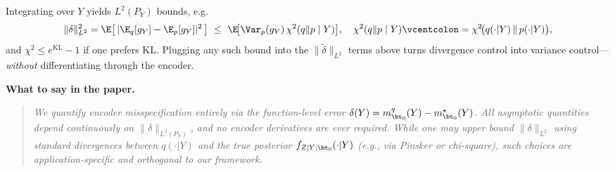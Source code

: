 Integrating over \(Y\) yields \(L^2(P_Y)\) bounds, e.g.
\[
\|\delta\|_{L^2}^2
=\E\big[\,|\E_q[g_Y]-\E_p[g_Y]|^2\,\big]
\ \le\ \E\!\big[\Var_p(g_Y)\,\chi^2(q\|p\mid Y)\big],
\quad
\chi^2(q\|p\mid Y)\vcentcolon=\chi^2\!\big(q(\cdot|Y)\,\|\,p(\cdot|Y)\big),
\]
and \(\chi^2 \le e^{\mathrm{KL}}-1\) if one prefers KL. Plugging any such bound into the \(\|\tilde\delta\|_{L^2}\) terms above turns divergence control into variance control—\emph{without} differentiating through the encoder.

\medskip
\noindent\textbf{What to say in the paper.}
\begin{quote}
\emph{We quantify encoder misspecification entirely via the function-level error \(\delta(Y)=m_{\bt_0}^q(Y)-m_{\bt_0}^\star(Y)\). All asymptotic quantities depend continuously on \(\|\delta\|_{L^2(P_Y)}\), and no encoder derivatives are ever required. While one may upper bound \(\|\delta\|_{L^2}\) using standard divergences between \(q(\cdot|Y)\) and the true posterior \(f_{Z\mid Y;\bt_0}(\cdot|Y)\) (e.g., via Pinsker or chi-square), such choices are application-specific and orthogonal to our framework.}
\end{quote}
